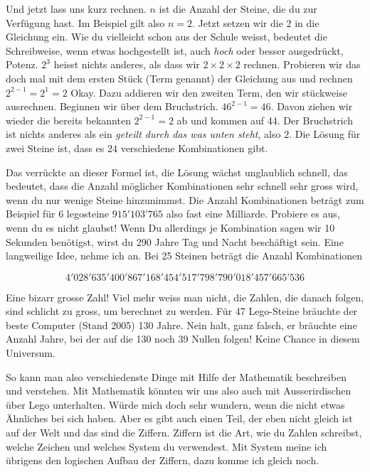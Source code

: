 Und jetzt lass uns kurz rechnen. $n$ ist die Anzahl der Steine, die du zur Verfügung hast. Im Beispiel gilt also $n=2$. Jetzt setzen wir die 2 in die Gleichung ein. Wie du vielleicht schon aus der Schule weisst, bedeutet die Schreibweise, wenn etwas hochgestellt ist, auch \textit{hoch} oder besser ausgedrückt, Potenz. $2^3$ heisst nichts anderes, als dass wir $2\times2\times2$ rechnen. Probieren wir das doch mal mit dem ersten Stück (Term genannt) der Gleichung aus und rechnen $2^{2-1}=2^1=2$ Okay. Dazu addieren wir den zweiten Term, den wir stückweise ausrechnen. Beginnen wir über dem Bruchstrich. $46^{2-1}=46$. Davon ziehen wir wieder die bereits bekannten $2^{2-1}=2$ ab und kommen auf 44. Der Bruchstrich ist nichts anderes als ein \textit{geteilt durch das was unten steht}, also $2$. Die Lösung für zwei Steine ist, dass es $24$ verschiedene Kombinationen gibt.

Das verrückte an dieser Formel ist, die Lösung wächst unglaublich schnell, das bedeutet, dass die Anzahl möglicher Kombinationen sehr schnell sehr gross wird, wenn du nur wenige Steine hinzunimmst. Die Anzahl Kombinationen beträgt zum Beispiel für 6 legosteine $915'103’765$ also fast eine Milliarde. Probiere es aus, wenn du es nicht glaubst! Wenn Du allerdings je Kombination sagen wir 10 Sekunden benötigst, wirst du 290 Jahre Tag und Nacht beschäftigt sein. Eine langweilige Idee, nehme ich an. Bei 25 Steinen beträgt die Anzahl Kombinationen

\begin{footnotesize}
$$4'028'635'400'867'168'454'517'798'790'018'457'665’536$$
\end{footnotesize}

Eine bizarr grosse Zahl! Viel mehr weiss man nicht, die Zahlen, die danach folgen, sind schlicht zu gross, um berechnet zu werden. Für 47 Lego-Steine bräuchte der beste Computer (Stand 2005) 130 Jahre. Nein halt, ganz falsch, er bräuchte eine Anzahl Jahre, bei der auf die 130 noch 39 Nullen folgen! Keine Chance in diesem Universum.

So kann man also verschiedenste Dinge mit Hilfe der Mathematik beschreiben und verstehen. Mit Mathematik könnten wir uns also auch mit Ausserirdischen über Lego unterhalten. Würde mich doch sehr wundern, wenn die nicht etwas Ähnliches bei sich haben. Aber es gibt auch einen Teil, der eben nicht gleich ist auf der Welt und das sind die Ziffern. Ziffern ist die Art, wie du Zahlen schreibst, welche Zeichen und welches System du verwendest. Mit System meine ich übrigens den logischen Aufbau der Ziffern, dazu komme ich gleich noch.

